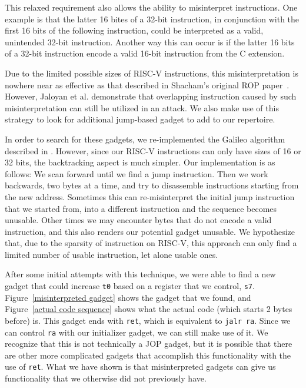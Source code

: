 This relaxed requirement also allows the ability to misinterpret instructions.
One example is that the latter 16 bites of a 32-bit instruction, in conjunction
with the first 16 bits of the following instruction, could be interpreted as
a valid, unintended 32-bit instruction. Another way this can occur is if the
latter 16 bits of a 32-bit instruction encode a valid 16-bit instruction from
the C extension.

Due to the limited possible sizes of RISC-V instructions, this misinterpretation
is nowhere near as effective as that described in Shacham's original ROP
paper~\cite{shacham07ropx86}. However, Jaloyan et al. demonstrate that overlapping
instruction caused by such misinterpretation can still be utilized in an
attack\cite{jaloyan20ropriscv}. We also make use of this strategy to look for
additional jump-based gadget to add to our repertoire.

In order to search for these gadgets, we re-implemented the Galileo algorithm
described in \cite{shacham07ropx86}. However, since our RISC-V instructions can
only have sizes of 16 or 32 bits, the backtracking aspect is much simpler. Our
implementation is as follows: We scan forward until we find a jump instruction.
Then we work backwards, two bytes at a time, and try to disassemble instructions
starting from the new address. Sometimes this can re-misinterpret the initial
jump instruction that we started from, into a different instruction and the
sequence becomes unusable. Other times we may encounter bytes that do not encode
a valid instruction, and this also renders our potential gadget unusable. We
hypothesize that, due to the sparsity of instruction on RISC-V, this approach
can only find a limited number of usable instruction, let alone usable ones.

After some initial attempts with this technique, we were able to find a new
gadget that could increase \verb|t0| based on a register that we control,
\verb|s7|. Figure~\ref{misinterpreted gadget} shows the gadget that we found,
and Figure~\ref{actual code sequence} shows what the actual code (which starts
2 bytes before) is. This gadget ends with \verb|ret|, which is equivalent to
\verb|jalr ra|. Since we can control \verb|ra| with our initializer gadget, we
can still make use of it. We recognize that this is not technically a JOP
gadget, but it is possible that there are other more complicated gadgets that
accomplish this functionality with the use of \verb|ret|. What we have shown is
that misinterpreted gadgets can give us functionality that we otherwise did not
previously have.

